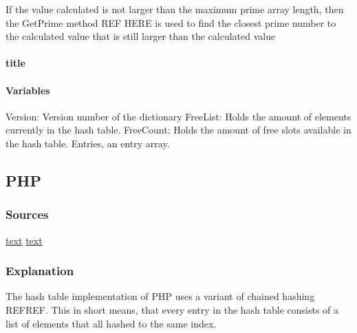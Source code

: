 \documentclass[titlepage]{article}
\begin{document}
	If the value calculated is not larger than the maximum prime array length, then the GetPrime method REF HERE is used to find the closest prime number to the calculated value that is still larger than the calculated value 
	
	
	
	\paragraph{title}
	\paragraph{Variables}
	Version: Version number of the dictionary
	FreeList: Holds the amount of elements currently in the hash table.
	FreeCount: Holds the amount of free slots available in the hash table. 
	Entries, an entry array. 
	
	
	\subsection{PHP}
	\subsubsection{Sources}
\href{http://nikic.github.io/2012/03/28/Understanding-PHPs-internal-array-implementation.html}{text}
\href{	http://lxr.php.net/xref/PHP_5_4/Zend/zend_hash.h#66}{text}
	\subsubsection{Explanation}
	The hash table implementation of PHP uses a variant of chained hashing REFREF. This in short means, that every entry in the hash table consists of a list of elements that all hashed to the same index. 
	
\end{document}

